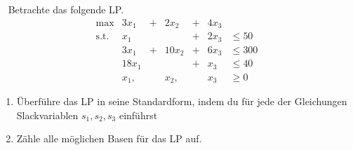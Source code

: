 \documentclass{uebung_cs}
\begin{document}
\begin{aufgabe}[Standardform]\
	Betrachte das folgende \acs{LP}.
	\[
		\begin{array}{rrrllll}
			\text{max}    & 3x_1 		    & + & 2 x_2	& +  & 4x_3  &\\
			\text{s.t.}	&  x_1		    & 	&		& +	 & 2x_3  & \le 50 \\
								& 3x_1 		    & + & 10x_2	& +	 & 6x_3	 & \le 300\\
								& 18 x_1 	    &   &       & +  & x_3 	 & \le 40\\ 
								& x_1,      	&	& x_2,	&	 & x_3	 &\geq 0 
		\end{array}
	\]
	\begin{enumerate}
		\item Überführe das \acs{LP} in seine Standardform, indem du für jede der Gleichungen Slackvariablen $s_1,s_2,s_3$ einführst
		\item Zähle alle möglichen Basen für das \acs{LP} auf.
	\end{enumerate}
\end{aufgabe}
\end{document}
